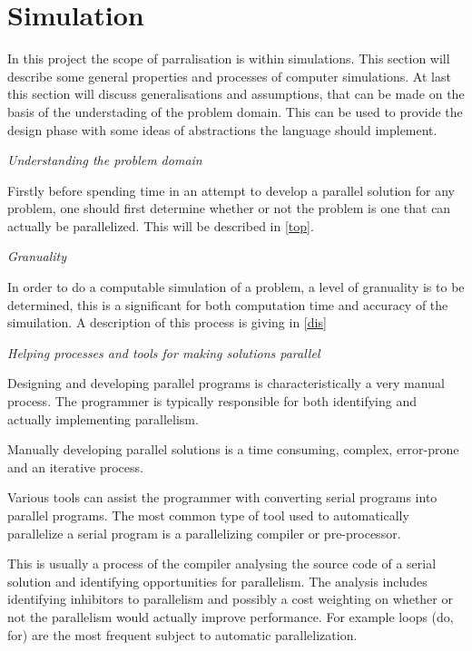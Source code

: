 \chapter{Simulation}

In this project the scope of parralisation is within simulations. This section will describe some general properties and processes of computer simulations. At last this section will discuss generalisations and assumptions, that can be made on the basis of the understading of the problem domain. This can be used to provide the design phase with some ideas of abstractions the language should implement.

\emph{Understanding the problem domain}

Firstly before spending time in an attempt to develop a parallel solution for any problem, one should first determine whether or not the problem is one that can actually be parallelized. This will be described in \cref{top}.

\emph{Granuality}

In order to do a computable simulation of a problem, a level of granuality is to be determined, this is a significant for both computation time and accuracy of the simuilation. A description of this process is giving in \cref{dis}

\emph{Helping processes and tools for making solutions parallel}

Designing and developing parallel programs is characteristically a very manual process. The programmer is typically responsible for both identifying and actually implementing parallelism.

Manually developing parallel solutions is a time consuming, complex, error-prone and an iterative process.

Various tools can assist the programmer with converting serial programs into parallel programs. The most common type of tool used to automatically parallelize a serial program is a parallelizing compiler or pre-processor.

This is usually a process of the compiler analysing the source code of a serial solution and identifying opportunities for parallelism. The analysis includes identifying inhibitors to parallelism and possibly a cost weighting on whether or not the parallelism would actually improve performance. For example loops (do, for) are the most frequent subject to automatic parallelization.
